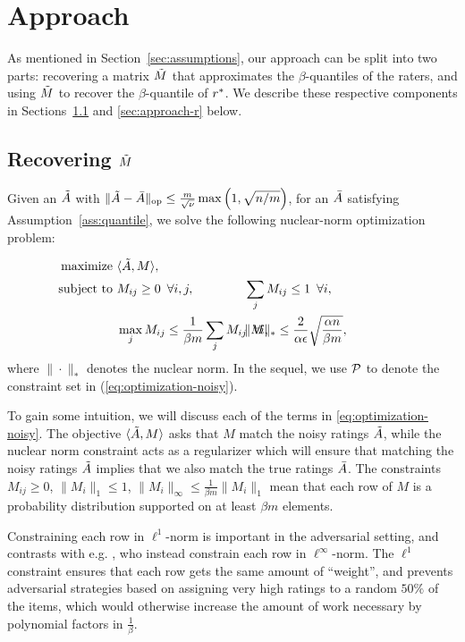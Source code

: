 \section{Approach}
\label{sec:approach}

As mentioned in Section~\ref{sec:assumptions}, our approach can be split into 
two parts: recovering a matrix $\tilde{M}$ that approximates the $\beta$-quantiles of 
the raters, and using $\tilde{M}$ to recover the $\beta$-quantile of $r^*$. We 
describe these respective components in Sections~\ref{sec:approach-M} and 
\ref{sec:approach-r} below.

\subsection{Recovering $\tilde{M}$}
\label{sec:approach-M}
Given an $\tilde{A}$ with $\|\tilde{A} - \bar{A}\|_{\mathrm{op}} \leq \frac{m}{\sqrt{\nu}}\max\left( 1, \sqrt{n/m} \right)$, for an 
$\bar{A}$ satisfying Assumption~\ref{ass:quantile}, we solve the following 
nuclear-norm optimization problem:

\begin{align}
\label{eq:optimization-noisy}
\text{maximize } &\langle \A, M \rangle, \\
\notag \text{ subject to } &M_{ij} \geq 0 \,\,\, \forall i,j, 
  &&\hskip-0.4in\sum_j M_{ij} \leq 1 \,\,\, \forall i, \\
\notag  &\max_j M_{ij} \leq \frac{1}{\beta m}\sum_j M_{ij} \,\,\, \forall i, 
  &&\hskip-0.4in\|M\|_* \leq \frac{2}{\alpha\epsilon}\sqrt{\frac{\alpha n}{\beta m}}, \phantom{xxxxxxx}
\end{align}
where $\|\cdot\|_*$ denotes the nuclear norm. In the sequel, 
we use $\mathcal{P}$ to denote the constraint set in (\ref{eq:optimization-noisy}).

To gain some intuition, we will 
discuss each of the terms in \eqref{eq:optimization-noisy}. The objective 
$\langle \tilde{A}, M \rangle$ asks that $M$ match the noisy ratings 
$\tilde{A}$, while the nuclear norm constraint acts as a regularizer which will 
ensure that matching the noisy ratings $\tilde{A}$ implies that we also match the true 
ratings $\bar{A}$. The constraints $M_{ij} \geq 0$, $\|M_i\|_1 \leq 1$, 
$\|M_i\|_{\infty} \leq \frac{1}{\beta m} \|M_i\|_1$ mean that each row of 
$M$ is a probability distribution supported on at least $\beta m$ elements. 

Constraining each row in $\ell^1$-norm is important in the adversarial setting, 
and contrasts with e.g. \citet{todo}, who instead constrain each row in 
$\ell^{\infty}$-norm. The $\ell^1$ constraint ensures that each row gets the 
same amount of ``weight'', and prevents adversarial strategies based on assigning 
very high ratings to a random $50\%$ of the items, which would otherwise 
increase the amount of work necessary by polynomial factors in $\frac{1}{\beta}$.

